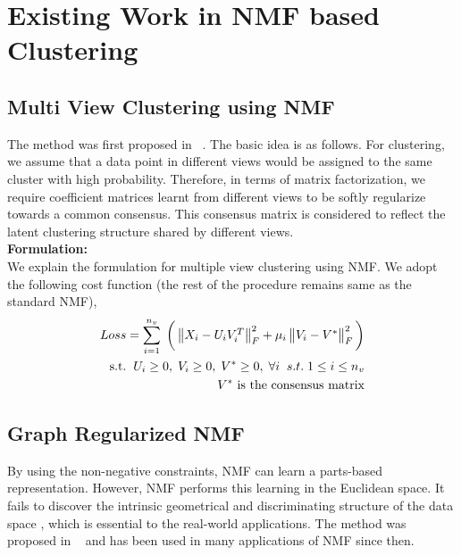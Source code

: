 \documentclass[a4paper]{article}
\begin{document}
	\tableofcontents

	\pagebreak	
	
	\section{Existing Work in NMF based Clustering}
	
	\subsection{Multi View Clustering using NMF}

The method was first proposed in ~\cite{nmfsdm}. The basic idea is as follows. For clustering, we assume that a data point in different views would be assigned to the same cluster with high probability. Therefore, in terms of matrix factorization, we require coefficient matrices learnt from different views to be softly regularize towards a common consensus. This consensus matrix is considered to reflect the latent clustering structure shared by different views.\\
	
	\noindent
	\textbf{Formulation:}\\
	We explain the formulation for multiple view clustering using NMF. We adopt the following cost function (the rest of the procedure remains same as the standard NMF),
	\begin{multline*}	
	Loss = \displaystyle\sum_{i=1}^{n_{v}} \; \bigg(\begin{Vmatrix} X_{i}-U_{i}V^{T}_{i} \end{Vmatrix}^{2}_{F}	
		+ \mu_{i}\begin{Vmatrix} V_{i}-V^{*}\end{Vmatrix}^{2}_{F} \bigg) \\	
		\hfill {\text{s.t.}} \hspace{2mm}  U_{i}\geq0,\;V_{i}\geq0,\;V^{*}\geq0,\; \forall i \;\;s.t.\; 1 \leq i \leq n_{v}\\
		\hfill V^{*} \text{ is the consensus matrix}
	\end{multline*}	
	
	\subsection{Graph Regularized NMF}
	
	By using the non-negative constraints, NMF can learn a parts-based representation. However, NMF performs
this learning in the Euclidean space. It fails to discover the intrinsic geometrical and discriminating structure of the data space \cite{cai2008non}, which is essential to the real-world applications. The method was proposed in ~\cite{GReg} and has been used in many applications of NMF since then.	\\
\end{document}
